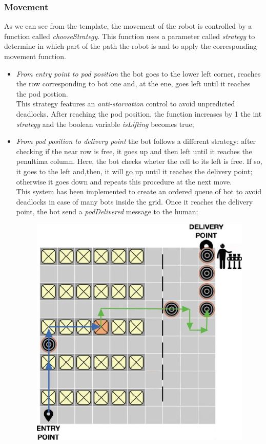 \documentclass[10pt,a4paper]{article}
\begin{document}
			\subsubsection{Movement}
				As we can see from the template, the movement of the robot is controlled by a function called \emph{chooseStrategy}. This function uses a parameter called \emph{strategy} to determine in which part of the path the robot is and to apply the corresponding movement function.\\
				\begin{itemize}
					\item \emph{From entry point to pod position} the bot goes to the lower left corner, reaches the row corresponding to bot one and, at the ene, goes left until it reaches the pod postion.\\This strategy features an \emph{anti-starvation} control to avoid unpredicted deadlocks. After reaching the pod position, the function increases by 1 the int \emph{strategy} and the boolean variable \emph{isLifting} becomes true;
					\item \emph{From pod position to delivery point} the bot follows a different strategy: after checking if the near row is free, it goes up and then left until it reaches the penultima column. Here, the bot checks wheter the cell to its left is free. If so, it goes to the left and,then, it will go up until it reaches the delivery point; otherwise it goes down and repeats this procedure at the next move.\\This system has been implemented to create an ordered queue of bot to avoid deadlocks in case of many bots inside the grid. Once it reaches the delivery point, the bot send a \emph{podDelivered} message to the human;
					\begin{figure}[ht]
						\centering
						\includegraphics[scale = 0.36]{Images/BotMovement1.JPG}

\end{figure}
\end{itemize}
\end{document}
